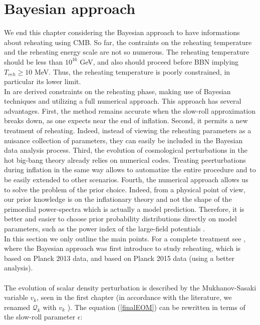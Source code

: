 \documentclass[11pt,a4paper,twoside]{book}
\begin{document}
 \section{Bayesian approach}
 We end this chapter considering the Bayesian approach to have informations about reheating using CMB. So far, the contraints on the reheating temperature and the reheating energy scale are not so numerous. The reheating temperature should be less than $ 10^{16}  $ GeV, and also should proceed before BBN implying $ T_{reh} \ge 10 $ MeV. Thus, the reheating temperature is poorly constrained, in particular its lower limit.\\
 In \cite{Chap3:Martin_Ringeval} are derived constraints on the reheating phase, making use of Bayesian techniques and utilizing a full numerical approach. This approach has several advantages. First, the method remains accurate when the slow-roll approximation breaks down, as one expects near the end of inflation. Second, it permits a new treatment of reheating. Indeed, instead of viewing the reheating parameters as a nuisance collection of parameters, they can easily be included in the Bayesian data analysis process. Third, the evolution of cosmological perturbations in the hot big-bang theory already relies on numerical codes. Treating peerturbations during inflation in the same way allows to automatize the entire procedure and to be easily extended to other scenarios. Fourth, the numerical approach allows us to solve the problem of the prior choice. Indeed, from a physical point of view, our prior knowledge is on the inflationary theory and not the shape of the primordial power-spectra which is actually a model prediction. Therefore, it is better and easier to choose prior probability distributions directly on model parameters, such as the power index of the large-field potentials \cite{Chap3:Martin_Ringeval}.\\
 In this section we only outline the main points. For a complete treatment see \cite{Chap3:Martin_Ringeval}, where the Bayesian approach was first introduce to study reheating, \cite{Chap3:Martin_Observing_Reheating} which is based on Planck 2013 data, and \cite{Chap3:Martin_Milestone} based on Planck 2015 data (using a better analysis).\\
 \\
 The evolution of scalar density perturbation is described by the Mukhanov-Sasaki variable $ v_{k} $, seen in the first chapter (in accordance with the literature, we renamed $ \mathcal{Q}_{k} $ with $ v_{k} $ ). The equation (\ref{finalEOM}) can be rewritten in terms of the slow-roll parameter $\epsilon$:
\end{document}
